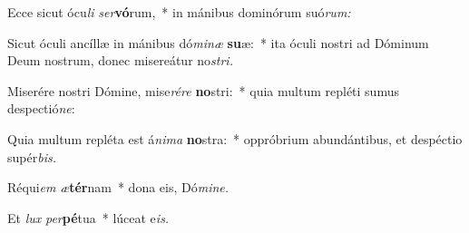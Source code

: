 \item Ecce sicut ócu\textit{li} \textit{ser}\textbf{vó}rum,~* in mánibus dominórum suó\textit{rum:}
\item Sicut óculi ancíllæ in mánibus dó\textit{minæ} \textbf{su}æ:~* ita óculi nostri ad Dóminum Deum nostrum, donec misereátur no\hspace*{0.03em}\textit{stri.}
\item Miserére nostri Dómine, mise\textit{rére} \textbf{no}stri:~* quia multum repléti sumus despectió\textit{ne}:
\item Quia multum repléta est á\hspace*{0.03em}\textit{nima} \textbf{no}stra:~* oppróbrium abundántibus, et despéctio supér\textit{bis.}
\item Réqui\hspace*{0.03em}\textit{em} \textit{æ}\textbf{tér}nam~* dona eis, Dó\textit{mine.}
\item Et \textit{lux} \textit{per}\textbf{pé}tua~* lúceat e\hspace*{0.03em}\textit{is.}